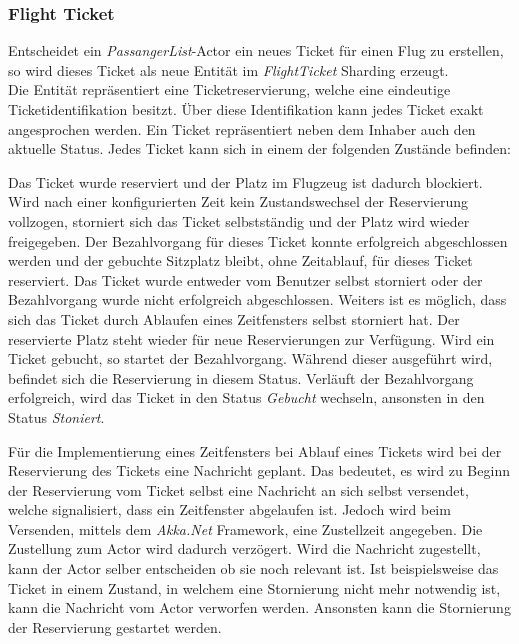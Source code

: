 \subsubsection{Flight Ticket}
Entscheidet ein \textit{PassangerList}-Actor ein neues Ticket für einen Flug zu erstellen, so wird dieses Ticket als neue Entität im \textit{FlightTicket} Sharding erzeugt. \\
Die Entität repräsentiert eine Ticketreservierung, welche eine eindeutige Ticketidentifikation besitzt. Über diese Identifikation kann jedes Ticket exakt angesprochen werden. Ein Ticket repräsentiert neben dem Inhaber auch den aktuelle Status. Jedes Ticket kann sich in einem der folgenden Zustände befinden:
% 
% 
\begin{enumerate}
     Das Ticket wurde reserviert und der Platz im Flugzeug ist dadurch blockiert. Wird nach einer konfigurierten Zeit kein Zustandswechsel der Reservierung vollzogen, storniert sich das Ticket selbstständig und der Platz wird wieder freigegeben.
     Der Bezahlvorgang für dieses Ticket konnte erfolgreich abgeschlossen werden und der gebuchte Sitzplatz bleibt, ohne Zeitablauf, für dieses Ticket reserviert.
     Das Ticket wurde entweder vom Benutzer selbst storniert oder der Bezahlvorgang wurde nicht erfolgreich abgeschlossen. Weiters ist es möglich, dass sich das Ticket durch Ablaufen eines Zeitfensters selbst storniert hat. Der reservierte Platz steht wieder für neue Reservierungen zur Verfügung.
     Wird ein Ticket gebucht, so startet der Bezahlvorgang. Während dieser ausgeführt wird, befindet sich die Reservierung in diesem Status. Verläuft der Bezahlvorgang erfolgreich, wird das Ticket in den Status \textit{Gebucht} wechseln, ansonsten in den Status \textit{Stoniert}.
\end{enumerate}
Für die Implementierung eines Zeitfensters bei Ablauf eines Tickets wird bei der Reservierung des Tickets eine Nachricht geplant. Das bedeutet, es wird zu Beginn der Reservierung vom Ticket selbst eine Nachricht an sich selbst versendet, welche signalisiert, dass ein Zeitfenster abgelaufen ist. Jedoch wird beim Versenden, mittels dem \textit{Akka.Net} Framework, eine Zustellzeit angegeben. Die Zustellung zum Actor wird dadurch verzögert. Wird die Nachricht zugestellt, kann der Actor selber entscheiden ob sie noch relevant ist. Ist beispielsweise das Ticket in einem Zustand, in welchem eine Stornierung nicht mehr notwendig ist, kann die Nachricht vom Actor verworfen werden. Ansonsten kann die Stornierung der Reservierung gestartet werden. \\
